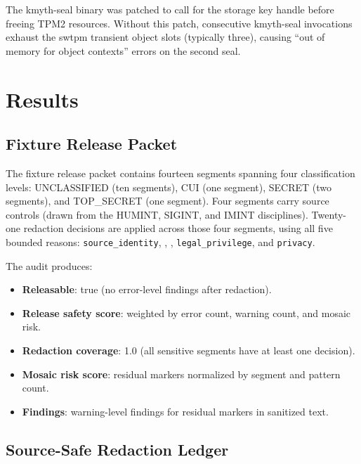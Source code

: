 \documentclass[
]{article}
\providecommand{\tightlist}{%
  \setlength{\itemsep}{0pt}\setlength{\parskip}{0pt}}
\begin{document}
The kmyth-seal binary was patched to call
 for the storage key handle before
freeing TPM2 resources. Without this patch, consecutive kmyth-seal
invocations exhaust the swtpm transient object slots (typically three),
causing ``out of memory for object contexts'' errors on the second seal.

\newpage

\section{Results}\label{results}

\subsection{Fixture Release Packet}\label{fixture-release-packet}

The fixture release packet contains fourteen segments spanning four
classification levels: UNCLASSIFIED (ten segments), CUI (one segment),
SECRET (two segments), and TOP\_SECRET (one segment). Four segments
carry source controls (drawn from the HUMINT, SIGINT, and IMINT
disciplines). Twenty-one redaction decisions are applied across those
four segments, using all five bounded reasons:
\texttt{source\_identity}, ,
, \texttt{legal\_privilege}, and
\texttt{privacy}.

The audit produces:

\begin{itemize}
\tightlist
\item
  \textbf{Releasable}: true (no error-level findings after redaction).
\item
  \textbf{Release safety score}: weighted by error count, warning count,
  and mosaic risk.
\item
  \textbf{Redaction coverage}: 1.0 (all sensitive segments have at least
  one decision).
\item
  \textbf{Mosaic risk score}: residual markers normalized by segment and
  pattern count.
\item
  \textbf{Findings}: warning-level findings for residual markers in
  sanitized text.
\end{itemize}

\subsection{Source-Safe Redaction
Ledger}\label{source-safe-redaction-ledger}
\end{document}
